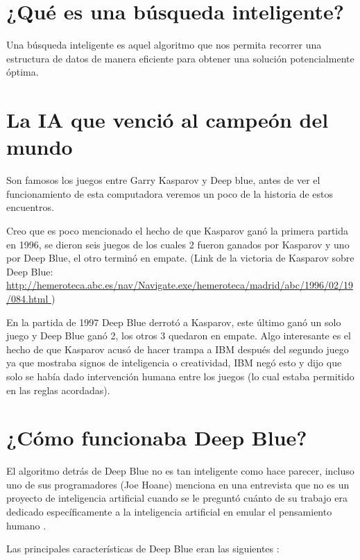 \documentclass[11pt,fleqn]{book} %
\begin{document}
\section{¿Qué es una búsqueda inteligente?} 

Una búsqueda inteligente es aquel algoritmo que nos permita recorrer una estructura de datos de manera eficiente para obtener una solución potencialmente óptima. 

\section{La IA que venció al campeón del mundo} 

Son famosos los juegos entre Garry Kasparov y Deep blue, antes de ver el funcionamiento de esta computadora veremos un poco de la historia de estos encuentros.

Creo que es poco mencionado el hecho de que Kasparov ganó la primera partida en 1996, se dieron seis juegos de los cuales 2 fueron ganados por Kasparov y uno por Deep Blue, el otro terminó en empate. (Link de la victoria de Kasparov sobre Deep Blue: \url{http://hemeroteca.abc.es/nav/Navigate.exe/hemeroteca/madrid/abc/1996/02/19/084.html })

En la partida de 1997 Deep Blue derrotó a Kasparov, este último ganó un solo juego y Deep Blue ganó 2, los otros 3 quedaron en empate. Algo interesante es el hecho de que Kasparov acusó de hacer trampa a IBM \cite{hsu2004behind} después del segundo juego ya que mostraba signos de inteligencia o creatividad, IBM negó esto y dijo que solo se había dado intervención humana entre los juegos (lo cual estaba permitido en las reglas acordadas).

\section{¿Cómo funcionaba Deep Blue?} 

El algoritmo detrás de Deep Blue no es tan inteligente como hace parecer, incluso uno de sus programadores (Joe Hoane) menciona en una entrevista que no es un proyecto de inteligencia artificial cuando se le preguntó cuánto de su trabajo era dedicado específicamente a la inteligencia artificial en emular el pensamiento humano \cite{DBFORBES}.

Las principales características de Deep Blue eran las siguientes 
\cite{CAMPBELL200257}:
\end{document}
